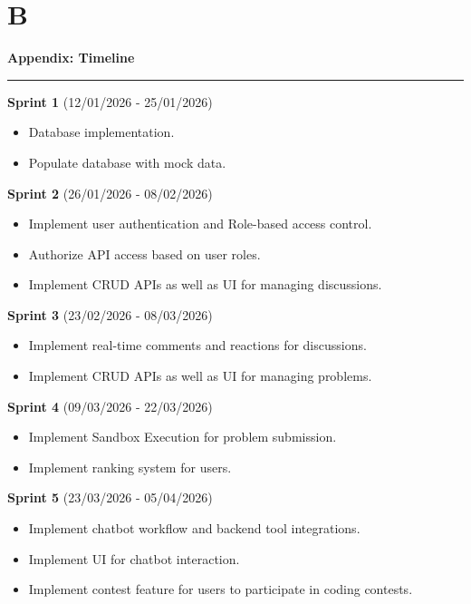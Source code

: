 \clearpage

\section*{B}

\doublespacing

\noindent \textbf{\Huge Appendix: Timeline}

\noindent\rule{\textwidth}{0.4pt}

\noindent \textbf{Sprint 1} (12/01/2026 - 25/01/2026)
\begin{itemize}
    \item Database implementation.
    \item Populate database with mock data.
\end{itemize}

\noindent \textbf{Sprint 2} (26/01/2026 - 08/02/2026)
\begin{itemize}
    \item Implement user authentication and Role-based access control.
    \item Authorize API access based on user roles.
    \item Implement CRUD APIs as well as UI for managing discussions.
\end{itemize}

\noindent \textbf{Sprint 3} (23/02/2026 - 08/03/2026)
\begin{itemize}
    \item Implement real-time comments and reactions for discussions.
    \item Implement CRUD APIs as well as UI for managing problems.
\end{itemize}

\noindent \textbf{Sprint 4} (09/03/2026 - 22/03/2026)
\begin{itemize}
    \item Implement Sandbox Execution for problem submission.
    \item Implement ranking system for users.
\end{itemize}

\noindent \textbf{Sprint 5} (23/03/2026 - 05/04/2026)
\begin{itemize}
    \item Implement chatbot workflow and backend tool integrations.
    \item Implement UI for chatbot interaction.
    \item Implement contest feature for users to participate in coding contests.
\end{itemize}

